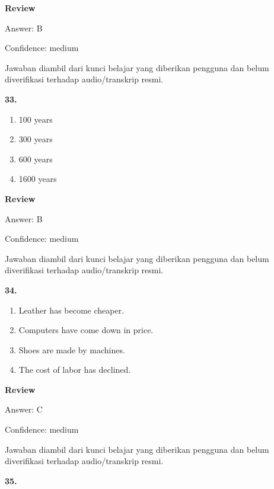 \documentclass[12pt]{article}
\begin{document}
\par
\begingroup
\setlength{\parskip}{0pt}
\setlength{\parindent}{0pt}
\textbf{Review}\par
Answer: B\par
Confidence: medium\par
Jawaban diambil dari kunci belajar yang diberikan pengguna dan belum diverifikasi terhadap audio/transkrip resmi.\par
\endgroup
\par
\vspace{0.25\baselineskip}
\noindent\textbf{33.}
\begin{enumerate}[label=(\Alph*),leftmargin=*,itemsep=0.2em]
\item 100 years
\item 300 years
\item 600 years
\item 1600 years
\end{enumerate}
\par
\begingroup
\setlength{\parskip}{0pt}
\setlength{\parindent}{0pt}
\textbf{Review}\par
Answer: B\par
Confidence: medium\par
Jawaban diambil dari kunci belajar yang diberikan pengguna dan belum diverifikasi terhadap audio/transkrip resmi.\par
\endgroup
\par
\vspace{0.25\baselineskip}
\noindent\textbf{34.}
\begin{enumerate}[label=(\Alph*),leftmargin=*,itemsep=0.2em]
\item Leather has become cheaper.
\item Computers have come down in price.
\item Shoes are made by machines.
\item The cost of labor has declined.
\end{enumerate}
\par
\begingroup
\setlength{\parskip}{0pt}
\setlength{\parindent}{0pt}
\textbf{Review}\par
Answer: C\par
Confidence: medium\par
Jawaban diambil dari kunci belajar yang diberikan pengguna dan belum diverifikasi terhadap audio/transkrip resmi.\par
\endgroup
\par
\vspace{0.25\baselineskip}
\noindent\textbf{35.}
\end{document}
